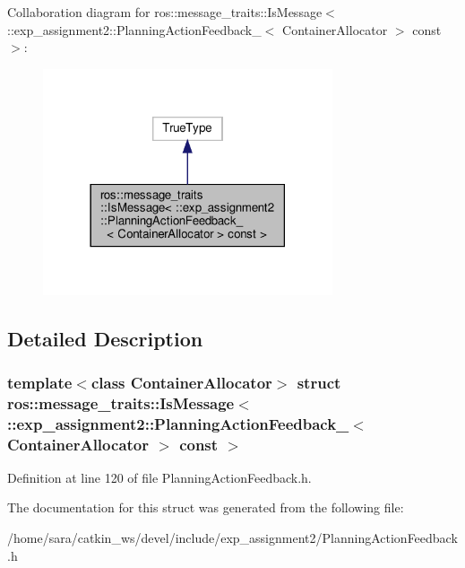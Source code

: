 Collaboration diagram for ros\+:\+:message\+\_\+traits\+:\+:Is\+Message$<$ \+:\+:exp\+\_\+assignment2\+:\+:Planning\+Action\+Feedback\+\_\+$<$ Container\+Allocator $>$ const $>$\+:
\nopagebreak
\begin{figure}[H]
\begin{center}
\leavevmode
\includegraphics[width=242pt]{structros_1_1message__traits_1_1IsMessage_3_01_1_1exp__assignment2_1_1PlanningActionFeedback___3c2169f50a84828e0b17e60479277d1a8}
\end{center}
\end{figure}


\subsection{Detailed Description}
\subsubsection*{template$<$class Container\+Allocator$>$\newline
struct ros\+::message\+\_\+traits\+::\+Is\+Message$<$ \+::exp\+\_\+assignment2\+::\+Planning\+Action\+Feedback\+\_\+$<$ Container\+Allocator $>$ const $>$}



Definition at line 120 of file Planning\+Action\+Feedback.\+h.



The documentation for this struct was generated from the following file\+:\begin{DoxyCompactItemize}
\item 
/home/sara/catkin\+\_\+ws/devel/include/exp\+\_\+assignment2/Planning\+Action\+Feedback.\+h\end{DoxyCompactItemize}
